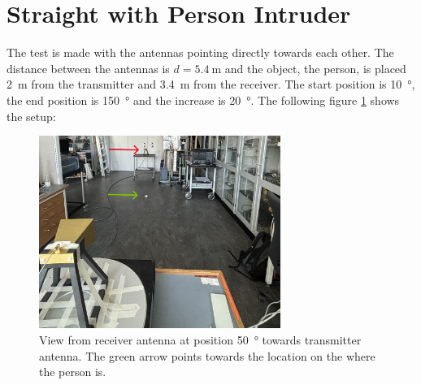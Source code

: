 \section{Straight with Person Intruder} \label{s:test5}
The test is made with the antennas pointing directly towards each other. The distance between the antennas is $d=\SI{5.4}{\meter}$ and the object, the person, is placed \SI{2}{\meter} from the transmitter and \SI{3.4}{\meter} from the receiver. The start position is \SI{10}{\degree}, the end position is \SI{150}{\degree} and the increase is \SI{20}{\degree}. The following figure \ref{fig:a2_5} shows the setup:
\begin{figure}[H]
    \centering
    \includegraphics[width=0.7\textwidth]{figures/test_intruder_person.JPG}
    \caption{View from receiver antenna at position \SI{50}{\degree} towards transmitter antenna. The green arrow points towards the location on the where the person is.} \label{fig:a2_5}
\end{figure}

